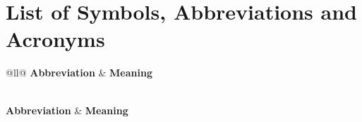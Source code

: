 \documentclass{thesis-report}
\begin{document}
\chapter*{List of Symbols, Abbreviations and Acronyms}
\small
\begin{longtable}{@{}ll@{}}
\toprule
\textbf{Abbreviation} & \textbf{Meaning} \\
\midrule
\endfirsthead

 \\
\toprule
\textbf{Abbreviation} & \textbf{Meaning} \\
\midrule
\endhead

\midrule
{} \\
\endfoot

\bottomrule
\endlastfoot


\end{longtable}
\end{document}
